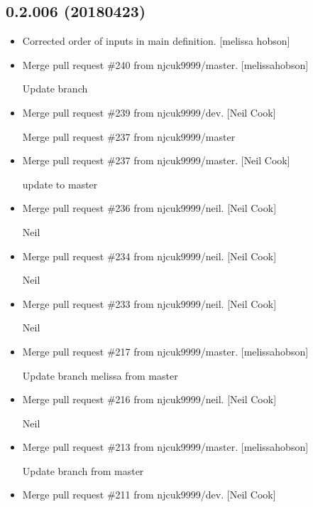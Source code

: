 \documentclass[a4paper,10pt,english]{report}
\begin{document}
\subsection{0.2.006 (2018\sphinxhyphen{}04\sphinxhyphen{}23)}
\label{\detokenize{misc/changelog:id474}}\begin{itemize}
\item {} 
Corrected order of inputs in  main definition. {[}melissa\sphinxhyphen{}
hobson{]}

\item {} 
Merge pull request \#240 from njcuk9999/master. {[}melissa\sphinxhyphen{}hobson{]}

Update branch

\item {} 
Merge pull request \#239 from njcuk9999/dev. {[}Neil Cook{]}

Merge pull request \#237 from njcuk9999/master

\item {} 
Merge pull request \#237 from njcuk9999/master. {[}Neil Cook{]}

update to master

\item {} 
Merge pull request \#236 from njcuk9999/neil. {[}Neil Cook{]}

Neil

\item {} 
Merge pull request \#234 from njcuk9999/neil. {[}Neil Cook{]}

Neil

\item {} 
Merge pull request \#233 from njcuk9999/neil. {[}Neil Cook{]}

Neil

\item {} 
Merge pull request \#217 from njcuk9999/master. {[}melissa\sphinxhyphen{}hobson{]}

Update branch melissa from master

\item {} 
Merge pull request \#216 from njcuk9999/neil. {[}Neil Cook{]}

Neil

\item {} 
Merge pull request \#213 from njcuk9999/master. {[}melissa\sphinxhyphen{}hobson{]}

Update branch from master

\item {} 
Merge pull request \#211 from njcuk9999/dev. {[}Neil Cook{]}


\end{itemize}
\end{document}
